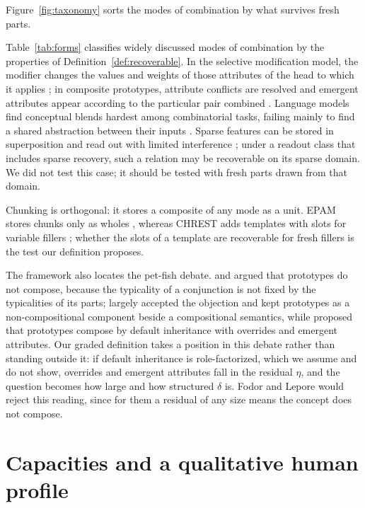 \documentclass[10pt]{article}
\theoremstyle{plain}
\theoremstyle{remark}
\begin{document}
Figure~\ref{fig:taxonomy} sorts the modes of combination by what survives fresh parts.

Table~\ref{tab:forms} classifies widely discussed modes of combination by the properties of Definition~\ref{def:recoverable}. In the selective modification model, the modifier changes the values and weights of those attributes of the head to which it applies \citep{smith1988}; in composite prototypes, attribute conflicts are resolved and emergent attributes appear according to the particular pair combined \citep{hampton1987}. Language models find conceptual blends hardest among combinatorial tasks, failing mainly to find a shared abstraction between their inputs \citep{schapiro2025}. Sparse features can be stored in superposition and read out with limited interference \citep{elhage2022}; under a readout class that includes sparse recovery, such a relation may be recoverable on its sparse domain. We did not test this case; it should be tested with fresh parts drawn from that domain.

\noindent
Chunking is orthogonal: it stores a composite of any mode as a unit. EPAM stores chunks only as wholes \citep{feigenbaum1984}, whereas CHREST adds templates with slots for variable fillers \citep{gobet1996templates,gobet2000}; whether the slots of a template are recoverable for fresh fillers is the test our definition proposes.

The framework also locates the pet-fish debate. \citet{osherson1981} and \citet{fodor1996} argued that prototypes do not compose, because the typicality of a conjunction is not fixed by the typicalities of its parts; \citet{kamp1995} largely accepted the objection and kept prototypes as a non-compositional component beside a compositional semantics, while \citet{hampton1987,hampton2012} proposed that prototypes compose by default inheritance with overrides and emergent attributes. Our graded definition takes a position in this debate rather than standing outside it: if default inheritance is role-factorized, which we assume and do not show, overrides and emergent attributes fall in the residual $\eta$, and the question becomes how large and how structured $\delta$ is. Fodor and Lepore would reject this reading, since for them a residual of any size means the concept does not compose.

\section{Capacities and a qualitative human profile}
\label{app:cases}
\end{document}
